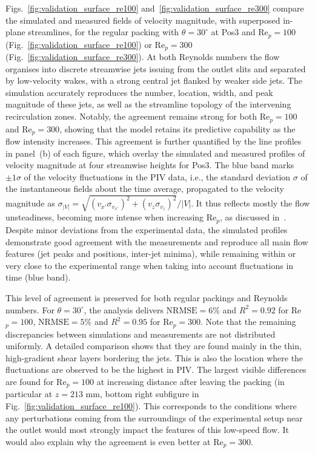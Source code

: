 Figs.~\ref{fig:validation_surface_re100} and~\ref{fig:validation_surface_re300} compare the simulated and measured fields of velocity magnitude, with superposed in-plane streamlines, for the regular packing with $\theta=30^\circ$ at Pos3 and Re$_p=100$ (Fig.~\ref{fig:validation_surface_re100}) or Re$_p=300$ (Fig.~\ref{fig:validation_surface_re300}). At both Reynolds numbers the flow organises into discrete streamwise jets issuing from the outlet slits and separated by low-velocity wakes, with a strong central jet flanked by weaker side jets. The simulation accurately reproduces the number, location, width, and peak magnitude of these jets, as well as the streamline topology of the intervening recirculation zones. Notably, the agreement remains strong for both Re$_p=100$ and Re$_p=300$, showing that the model retains its predictive capability as the flow intensity increases. This agreement is further quantified by the line profiles in panel~(b) of each figure, which overlay the simulated and measured profiles of velocity magnitude at four streamwise heights for Pos3. The blue band marks $\pm1\sigma$ of the velocity fluctuations in the PIV data, i.e., the standard deviation $\sigma$ of the instantaneous fields about the time average, propagated to the velocity magnitude as $\sigma_{|V|}=\sqrt{(v_{x'}\sigma_{v_{x'}})^2+(v_z\sigma_{v_z})^2}/|V|$. It thus reflects mostly the flow unsteadiness, becoming more intense when increasing Re$_p$, as discussed in~\cite{velten2026b}. Despite minor deviations from the experimental data, the simulated profiles demonstrate good agreement with the measurements and reproduce all main flow features (jet peaks and positions, inter-jet minima), while remaining within or very close to the experimental range when taking into account fluctuations in time (blue band).

This level of agreement is preserved for both regular packings and Reynolds numbers. For $\theta=30^\circ$, the analysis delivers $\mathrm{NRMSE}=6\%$ and $R^2=0.92$ for Re$_p=100$, $\mathrm{NRMSE}=5\%$ and $R^2=0.95$ for Re$_p=300$. Note that the remaining discrepancies between simulations and measurements are not distributed uniformly. A detailed comparison shows that they are found mainly in the thin, high-gradient shear layers bordering the jets. This is also the location where the fluctuations are observed to be the highest in PIV. The largest visible differences are found for Re$_p=100$ at increasing distance after leaving the packing (in particular at $z=213$ mm, bottom right subfigure in Fig.~\ref{fig:validation_surface_re100}). This corresponds to the conditions where any perturbations coming from the surroundings of the experimental setup near the outlet would most strongly impact the features of this low-speed flow. It would also explain why the agreement is even better at Re$_p=300$.

